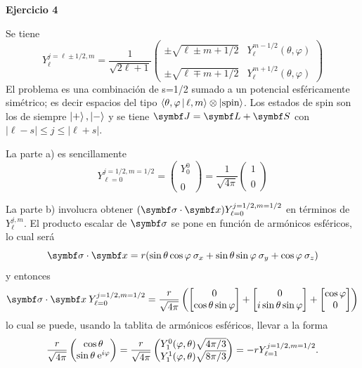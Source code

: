 \documentclass[10pt,oneside]{CBFT_book}
\begin{document}
\begin{ejemplo}{\bf Ejercicio 4}
 
Se tiene
\[
	Y_\ell^{j=\ell \pm 1/2,m} = \frac{1}{\sqrt{2\ell+1}} 
	\begin{pmatrix}
		\pm \sqrt{\ell \pm m + 1/2 } & Y_\ell^{m-1/2}(\theta,\varphi) \\
		\\
		\pm \sqrt{\ell \mp m + 1/2 } & Y_\ell^{m+1/2}(\theta,\varphi)
	\end{pmatrix}
\]
El problema es una combinación de s=1/2 sumado a un potencial esféricamente simétrico; es
decir espacios del tipo $\Braket{\theta,\varphi|\ell,m} \otimes \Ket{\text{spin}}$.
Los estados de spin son los de siempre $\Ket{+}, \Ket{-}$ y se tiene $\vb J = \vb L + \vb S$
con $|\ell-s| \leq j \leq |\ell+s|$.

La parte a) es sencillamente
\[
	Y_{\ell=0}^{j=1/2,m=1/2} = \begin{pmatrix}
	                        Y_0^0\\
	                        \\
	                        0
	                       \end{pmatrix} = \frac{1}{\sqrt{4\pi}}
	                       \begin{pmatrix}
	                        1 \\
	                        \\
	                        0
	                       \end{pmatrix}
\]

La parte b) involucra obtener $( \pe{\sigma}{x} ) Y_{\ell=0}^{j=1/2,m=1/2}$ en términos
de $Y_\ell^{j,m}$.
El producto escalar de $\vb \sigma$ se pone en función de armónicos esféricos, lo cual será
\[
	\pe{\sigma}{x} = r ( \sin\theta\cos\vp \:\sigma_x + \sin\theta\sin\vp \:\sigma_y +
	\cos\vp \:\sigma_z )
\]
y entonces
\[
	\pe{\sigma}{x} \: Y_{\ell=0}^{j=1/2,m=1/2} =
	\frac{r}{\sqrt{4\pi}}
	\left( 
	\begin{bmatrix}
	 0 \\
	 \cos\theta\sin\vp
	\end{bmatrix} +
	\begin{bmatrix}
	 0 \\
	 i\sin\theta\sin\vp
	\end{bmatrix} +
	\begin{bmatrix}
	 \cos\vp \\
	 0
	\end{bmatrix}
	\right)
\]
lo cual se puede, usando la tablita de armónicos esféricos, llevar a la forma
\[
	\frac{r}{\sqrt{4\pi}} 
	\begin{pmatrix}
	 \cos\theta \\
	 \sin\theta\:\mathrm{e}^{i\varphi}
	\end{pmatrix} =
	\frac{r}{\sqrt{4\pi}} 
	\begin{pmatrix}
	 Y_1^0(\varphi,\theta) \sqrt{4\pi/3} \\
	 Y_1^1(\varphi,\theta) \sqrt{8\pi/3}
	\end{pmatrix} =
	- r Y_{\ell=1}^{j=1/2,m=1/2}.
\]


\end{ejemplo}
\end{document}
